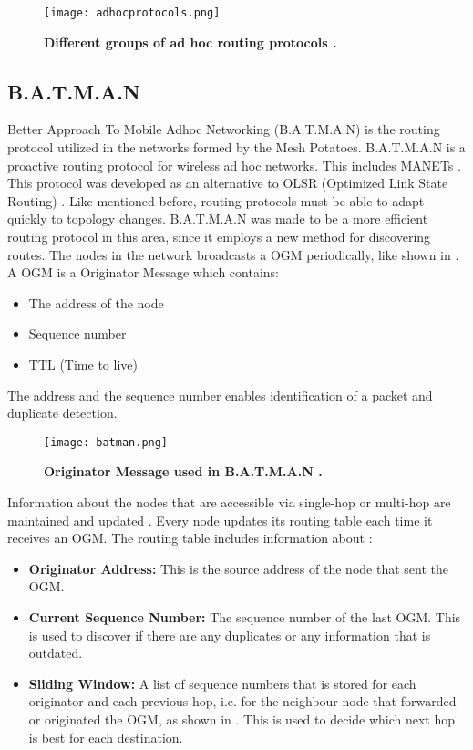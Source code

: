 \begin{figure}[t]
  \centering
    \texttt{[image: adhocprotocols.png]}
     \caption[Ad Hoc routing protocols]{\textbf{Different groups of ad hoc routing protocols \cite{adhoc}.}}
\label{fig:adhocprotocols}
\end{figure}


\subsection{B.A.T.M.A.N}
\label{subsec:batman}
Better Approach To Mobile Adhoc Networking (B.A.T.M.A.N) is the routing protocol utilized in the networks formed by the Mesh Potatoes. B.A.T.M.A.N is a proactive routing protocol for wireless ad hoc networks. This includes MANETs \cite{batman}. This protocol was developed as an alternative to OLSR (Optimized Link State Routing) \cite{batman2}. Like mentioned before, routing protocols must be able to adapt quickly to topology changes. B.A.T.M.A.N was made to be a more efficient routing protocol in this area, since it employs a new method for discovering routes. The nodes in the network broadcasts a OGM periodically, like shown in . A OGM is a Originator Message which contains: 

\begin{itemize}
\item The address of the node
\item Sequence number
\item TTL (Time to live)
\end{itemize}

The address and the sequence number enables identification of a packet and duplicate detection. 

\begin{figure}[b]
  \centering
    \texttt{[image: batman.png]}
     \caption[Originator Message in B.A.T.M.A.N]{\textbf{Originator Message used in B.A.T.M.A.N \cite{batman2}.}}
\label{fig:batman} 
\end{figure}


Information about the nodes that are accessible via single-hop or multi-hop are maintained and updated \cite{batman}. Every node updates its routing table each time it receives an OGM. The routing table includes information about \cite{batman2}:

\begin{itemize}
  \item \textbf{Originator Address:} This is the source address of the node that sent the OGM.
  \item \textbf{Current Sequence Number:} The sequence number of the last OGM. This is used to discover if there are any duplicates or any information that is outdated.
  \item \textbf{Sliding Window:} A list of sequence numbers that is stored for each originator and each previous hop, i.e. for the neighbour node that forwarded or originated the OGM, as shown in . This is used to decide which next hop is best for each destination. 
\end{itemize}

